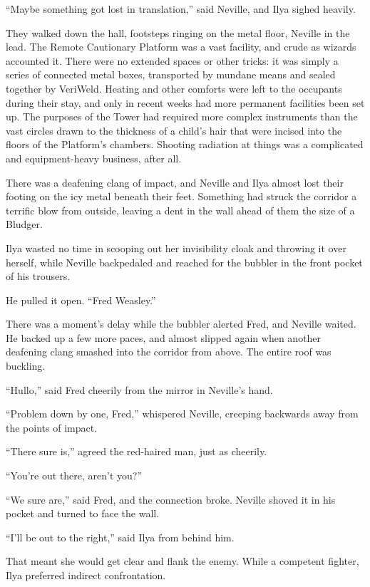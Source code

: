 ``Maybe something got lost in translation,'' said Neville, and Ilya
sighed heavily.

They walked down the hall, footsteps ringing on the metal floor, Neville
in the lead. The Remote Cautionary Platform was a vast facility, and
crude as wizards accounted it. There were no extended spaces or other
tricks: it was simply a series of connected metal boxes, transported by
mundane means and sealed together by VeriWeld. Heating and other
comforts were left to the occupants during their stay, and only in
recent weeks had more permanent facilities been set up. The purposes of
the Tower had required more complex instruments than the vast circles
drawn to the thickness of a child's hair that were incised into the
floors of the Platform's chambers. Shooting radiation at things was a
complicated and equipment-heavy business, after all.

There was a deafening clang of impact, and Neville and Ilya almost lost
their footing on the icy metal beneath their feet. Something had struck
the corridor a terrific blow from outside, leaving a dent in the wall
ahead of them the size of a Bludger.

Ilya wasted no time in scooping out her invisibility cloak and throwing
it over herself, while Neville backpedaled and reached for the bubbler
in the front pocket of his trousers.

He pulled it open. ``Fred Weasley.''

There was a moment's delay while the bubbler alerted Fred, and Neville
waited. He backed up a few more paces, and almost slipped again when
another deafening clang smashed into the corridor from above. The entire
roof was buckling.

``Hullo,'' said Fred cheerily from the mirror in Neville's hand.

``Problem down by one, Fred,'' whispered Neville, creeping backwards
away from the points of impact.

``There sure is,'' agreed the red-haired man, just as cheerily.

``You're out there, aren't you?''

``We sure are,'' said Fred, and the connection broke. Neville shoved it
in his pocket and turned to face the wall.

``I'll be out to the right,'' said Ilya from behind him.

That meant she would get clear and flank the enemy. While a competent
fighter, Ilya preferred indirect confrontation.

